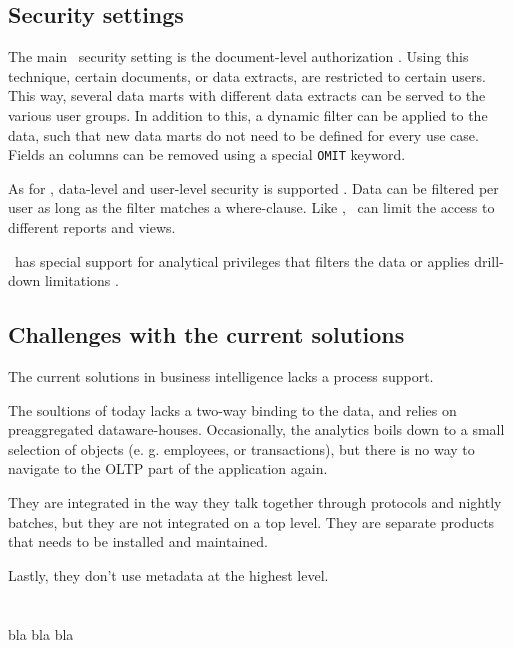 \subsection{Security settings}
\label{sub:Security settings}

The main \qlikview~security setting is the document-level authorization \cite{Qlik2011-hj}. Using this technique, certain documents, or data extracts, are restricted to certain users. This way, several data marts with different data extracts can be served to the various user groups. In addition to this, a dynamic filter can be applied to the data, such that new data marts do not need to be defined for every use case. Fields an columns can be removed using a special \texttt{OMIT} keyword.

As for \tableau, data-level and user-level security is supported \cite{Kamkolkar2015-iq}. Data can be filtered per user as long as the filter matches a where-clause. Like \qlikview, \tableau~can limit the access to different reports and views.

\saph~has special support for analytical privileges that filters the data or applies drill-down limitations \cite{Primsch2011-ij}.

\subsection{Challenges with the current solutions}
The current solutions in business intelligence lacks a process support.

The soultions of today lacks a two-way binding to the data, and relies on preaggregated dataware-houses. Occasionally, the analytics boils down to a small selection of objects (e. g. employees, or transactions), but there is no way to navigate to the OLTP part of the application again.

They are integrated in the way they talk together through protocols and nightly batches, but they are not integrated on a top level. They are separate products that needs to be installed and maintained.

Lastly, they don't use metadata at the highest level.

%
%

\section{\genusSoftware}
\label{sec:Genus Application Framework}
bla bla bla

